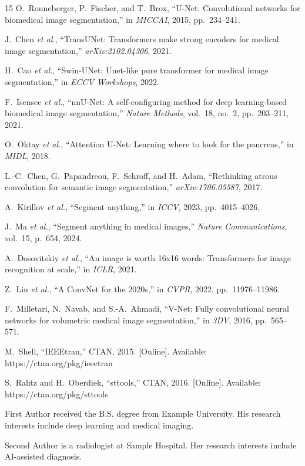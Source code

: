\documentclass[journal,12pt,draftclsnofoot,onecolumn]{IEEEtran}
\begin{document}
\begin{thebibliography}{15}
O.~Ronneberger, P.~Fischer, and T.~Brox, ``U-Net: Convolutional networks
for biomedical image segmentation,'' in \emph{MICCAI}, 2015, pp.~234--241.

J.~Chen \emph{et al.}, ``TransUNet: Transformers make strong encoders
for medical image segmentation,'' \emph{arXiv:2102.04306}, 2021.

H.~Cao \emph{et al.}, ``Swin-UNet: Unet-like pure transformer for
medical image segmentation,'' in \emph{ECCV Workshops}, 2022.

F.~Isensee \emph{et al.}, ``nnU-Net: A self-configuring method for deep
learning-based biomedical image segmentation,'' \emph{Nature Methods},
vol.~18, no.~2, pp.~203--211, 2021.

O.~Oktay \emph{et al.}, ``Attention U-Net: Learning where to look for
the pancreas,'' in \emph{MIDL}, 2018.

L.-C.~Chen, G.~Papandreou, F.~Schroff, and H.~Adam, ``Rethinking atrous
convolution for semantic image segmentation,'' \emph{arXiv:1706.05587},
2017.

A.~Kirillov \emph{et al.}, ``Segment anything,'' in \emph{ICCV}, 2023,
pp.~4015--4026.

J.~Ma \emph{et al.}, ``Segment anything in medical images,''
\emph{Nature Communications}, vol.~15, p.~654, 2024.

A.~Dosovitskiy \emph{et al.}, ``An image is worth 16x16 words:
Transformers for image recognition at scale,'' in \emph{ICLR}, 2021.

Z.~Liu \emph{et al.}, ``A ConvNet for the 2020s,'' in \emph{CVPR},
2022, pp.~11976--11986.

F.~Milletari, N.~Navab, and S.-A.~Ahmadi, ``V-Net: Fully convolutional
neural networks for volumetric medical image segmentation,'' in
\emph{3DV}, 2016, pp.~565--571.

M.~Shell, ``IEEEtran,'' CTAN, 2015. [Online].
Available: https://ctan.org/pkg/ieeetran

S.~Rahtz and H.~Oberdiek, ``sttools,'' CTAN, 2016. [Online].
Available: https://ctan.org/pkg/sttools
\end{thebibliography}

\begin{IEEEbiography}[{\fbox{\rule{0pt}{1in}\rule{0.8in}{0pt}}}]{First Author}
received the B.S. degree from Example University.
His research interests include deep learning and medical imaging.
\end{IEEEbiography}

\begin{IEEEbiography}[{\fbox{\rule{0pt}{1in}\rule{0.8in}{0pt}}}]{Second Author}
is a radiologist at Sample Hospital.
Her research interests include AI-assisted diagnosis.
\end{IEEEbiography}
\end{document}
